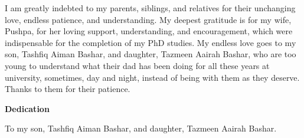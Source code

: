 I am greatly indebted to my parents, siblings, and relatives for their unchanging love, endless patience, and understanding. My deepest gratitude is for my wife, Pushpa, for her loving support, understanding, and encouragement, which were indispensable for the completion of my PhD studies. My endless love goes to my son, Tashfiq Aiman Bashar, and daughter, Tazmeen Aairah Bashar, who are too young to understand what their dad has been doing for all these years at university, sometimes, day and night, instead of being with them as they deserve. Thanks to them for their patience.

\cleardoublepage




\begin{center}
  \textbf{\LARGE{Dedication}}
\end{center}

To my son, Tashfiq Aiman Bashar, and daughter, Tazmeen Aairah Bashar.

\cleardoublepage




\renewcommand\contentsname{Table of Contents}
\tableofcontents
\cleardoublepage
{}     %




\listoftables
\cleardoublepage
{}		%




\listoffigures
\cleardoublepage
{}		%





